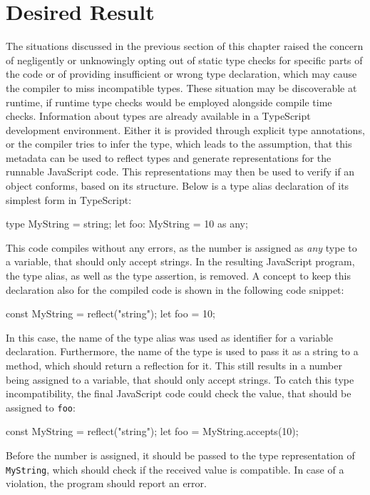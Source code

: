 

\section{Desired Result}
\label{sec:desired-result}

The situations discussed in the previous section of this chapter raised the concern of negligently or unknowingly opting out of static type checks for specific parts of the code or of providing insufficient or wrong type declaration, which may cause the compiler to miss incompatible types. These situation may be discoverable at runtime, if runtime type checks would be employed alongside compile time checks. Information about types are already available in a TypeScript development environment. Either it is provided through explicit type annotations, or the compiler tries to infer the type, which leads to the assumption, that this metadata can be used to reflect types and generate representations for the runnable JavaScript code. This representations may then be used to verify if an object conforms, based on its structure. Below is a type alias declaration of its simplest form in TypeScript:
\begin{JsCode}[numbers=none]
type MyString = string;
let foo: MyString = 10 as any;
\end{JsCode}
This code compiles without any errors, as the number is assigned as \emph{any} type to a variable, that should only accept strings. In the resulting JavaScript program, the type alias, as well as the type assertion, is removed. A concept to keep this declaration also for the compiled code is shown in the following code snippet:
\begin{JsCode}[numbers=none]
const MyString = reflect("string");
let foo = 10;
\end{JsCode}
In this case, the name of the type alias was used as identifier for a variable declaration. Furthermore, the name of the type is used to pass it as a string to a method, which should return a reflection for it. This still results in a number being assigned to a variable, that should only accept strings. To catch this type incompatibility, the final JavaScript code could check the value, that should be assigned to \texttt{foo}:
\begin{JsCode}[numbers=none]
const MyString = reflect("string");
let foo = MyString.accepts(10);
\end{JsCode}
Before the number is assigned, it should be passed to the type representation of \texttt{MyString}, which should check if the received value is compatible. In case of a violation, the program should report an error.


